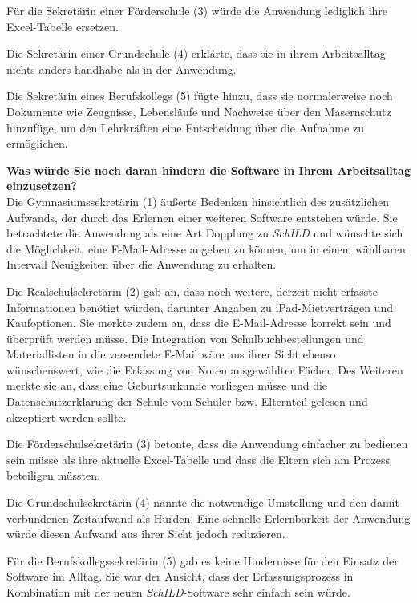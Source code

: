 Für die Sekretärin einer Förderschule (3) würde die Anwendung lediglich ihre Excel-Tabelle ersetzen.

Die Sekretärin einer Grundschule (4) erklärte, dass sie in ihrem Arbeitsalltag nichts anders handhabe als in der Anwendung.

Die Sekretärin eines Berufskollegs (5) fügte hinzu, dass sie normalerweise noch Dokumente wie Zeugnisse, Lebensläufe und Nachweise über den Masernschutz hinzufüge, um den Lehrkräften eine Entscheidung über die Aufnahme zu ermöglichen.

\textbf{Was würde Sie noch daran hindern die Software in Ihrem Arbeitsalltag einzusetzen?}\\
Die Gymnasiumssekretärin (1) äußerte Bedenken hinsichtlich des zusätzlichen Aufwands, der durch das Erlernen einer weiteren Software entstehen würde. Sie betrachtete die Anwendung als eine Art Dopplung zu \textit{SchILD} und wünschte sich die Möglichkeit, eine E-Mail-Adresse angeben zu können, um in einem wählbaren Intervall Neuigkeiten über die Anwendung zu erhalten.

Die Realschulsekretärin (2) gab an, dass noch weitere, derzeit nicht erfasste Informationen benötigt würden, darunter Angaben zu iPad-Mietverträgen und Kaufoptionen. Sie merkte zudem an, dass die E-Mail-Adresse korrekt sein und überprüft werden müsse. Die Integration von Schulbuchbestellungen und Materiallisten in die versendete E-Mail wäre aus ihrer Sicht ebenso wünschenswert, wie die Erfassung von Noten ausgewählter Fächer. Des Weiteren merkte sie an, dass eine Geburtsurkunde vorliegen müsse und die Datenschutzerklärung der Schule vom Schüler bzw. Elternteil gelesen und akzeptiert werden sollte.

Die Förderschulsekretärin (3) betonte, dass die Anwendung einfacher zu bedienen sein müsse als ihre aktuelle Excel-Tabelle und dass die Eltern sich am Prozess beteiligen müssten.

Die Grundschulsekretärin (4) nannte die notwendige Umstellung und den damit verbundenen Zeitaufwand als Hürden. Eine schnelle Erlernbarkeit der Anwendung würde diesen Aufwand aus ihrer Sicht jedoch reduzieren.

Für die Berufskollegssekretärin (5) gab es keine Hindernisse für den Einsatz der Software im Alltag. Sie war der Ansicht, dass der Erfassungsprozess in Kombination mit der neuen \textit{SchILD}-Software \glqq sehr einfach\grqq{}  sein würde.


